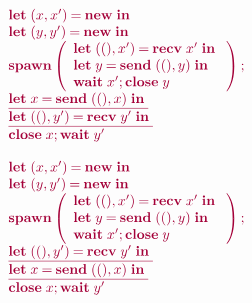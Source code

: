 \documentclass[main.tex]{subfiles}
\begin{document}
\begin{figure}
\begin{minipage}{0.5\linewidth}
\begin{example}%
  \label{ex:cycle}
  \[\tm{%
    \begin{array}{l}
      \letpair{x}{x'}{\new}{}
      \\
      \letpair{y}{y'}{\new}{}
      \\
      \spawn\left(%
      \begin{array}{l}
        {\letpair{\unit}{x'}{\recv\;{x'}}{}}
        \\
        {\letbind{y}{\send\;{\pair{\unit}{y}}}{}}
        \\
        {\andthen{\wait\;{x'}}{\close\;{y}}}
      \end{array}%
      \right);
      \\
      \underline{\letbind{x}{\send\;{\pair{\unit}{x}}}{}}
      \\
      \underline{\letpair{\unit}{y'}{\recv\;{y'}}{}}
      \\
      {\andthen{\close\;{x}}{\wait\;{y'}}}
    \end{array}
  }\]
\end{example}
\end{minipage}%
\begin{minipage}{0.5\linewidth}
\begin{example}[Deadlock]%
  \label{ex:deadlock}
  \[\tm{%
    \begin{array}{l}
      \letpair{x}{x'}{\new}{}
      \\
      \letpair{y}{y'}{\new}{}
      \\
      \spawn\left(%
      \begin{array}{l}
        {\letpair{\unit}{x'}{\recv\;{x'}}{}}
        \\
        {\letbind{y}{\send\;{\pair{\unit}{y}}}{}}
        \\
        {\andthen{\wait\;{x'}}{\close\;{y}}}
      \end{array}%
      \right);
      \\
      \underline{\letpair{\unit}{y'}{\recv\;{y'}}{}}
      \\
      \underline{\letbind{x}{\send\;{\pair{\unit}{x}}}{}}
      \\
      {\andthen{\close\;{x}}{\wait\;{y'}}}
    \end{array}
   }\]
\end{example}
\end{minipage}
\end{figure}
\end{document}
